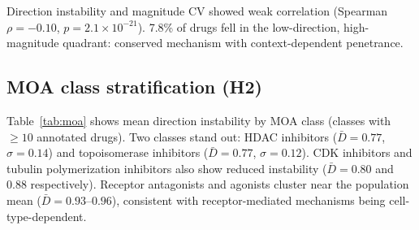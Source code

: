 \documentclass{article}
\begin{document}
Direction instability and magnitude CV showed weak correlation (Spearman
$\rho = -0.10$, $p = 2.1 \times 10^{-21}$). 7.8\% of drugs fell in
the low-direction, high-magnitude quadrant: conserved mechanism with
context-dependent penetrance.

\subsection{MOA class stratification (H2)}

Table~\ref{tab:moa} shows mean direction instability by MOA class (classes
with $\geq10$ annotated drugs). Two classes stand out: HDAC inhibitors
($\bar{D} = 0.77$, $\sigma = 0.14$) and topoisomerase inhibitors
($\bar{D} = 0.77$, $\sigma = 0.12$). CDK inhibitors and tubulin
polymerization inhibitors also show reduced instability ($\bar{D} = 0.80$
and $0.88$ respectively). Receptor antagonists and agonists cluster near
the population mean ($\bar{D} = 0.93$--$0.96$), consistent with
receptor-mediated mechanisms being cell-type-dependent.
\end{document}

